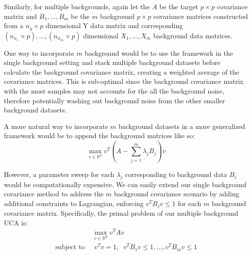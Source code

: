 \documentclass[12pt]{article}
\begin{document}


Similarly, for multiple backgrounds, again let the $A$ be the target $p \times p$ covariance matrix and $ B_1, \ldots, B_m$ be the $m$ background $p \times p$ covariance matrices constructed from a $n_y \times p$ dimensional Y data matrix and corresponding $(n_{x_1} \times p), \ldots, (n_{x_m}\times p)$ dimensional $X_1, \ldots, X_m$ background data matrices.

One way to incorporate $m$ background would be to use the framework in the single background setting and stack multiple background datasets before calculate the background covariance matrix, creating a weighted average of the covariance matrices. This is sub-optimal since the background covariance matrix with the most samples may not accounts for the all the background noise, therefore potentially washing out background noise from the other smaller background datasets. 

A more natural way to incorporate $m$ background datasets in a more generalized framework would be to append the background matrices like so:
\[\max_{v\in \mathbb{R}^p}{v^T\left(A - \sum^{m}_{j=1}{\lambda_jB_j}\right)v}\]

However, a parameter sweep for each $\lambda_j$ corresponding to background data $B_j$ would be computationally expensive.
We can easily extend our single background covariance method to address the $m$ background covariance scenario by adding additional constraints to Lagrangian, enforcing $ v^TB_jv\leq 1$ for each $m$ background covariance matrix. Specifically, the primal problem of our multiple background UCA is:
\begin{align}
  &\max_{v\in \mathbb{R}^p}{v^TAv} \label{eq:4}\\ 
  \text{subject to }&\; v^{T}v=1,\;\; v^TB_1 v \leq 1, \ldots, v^T B_m v\leq 1 \nonumber
\end{align}
\end{document}
